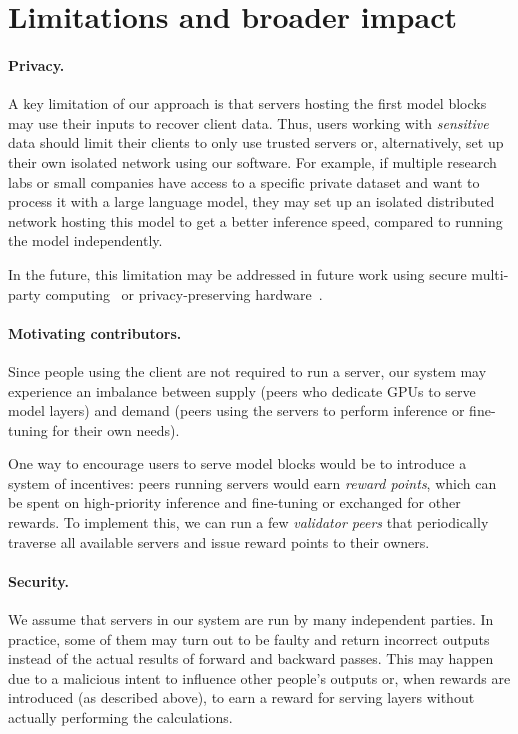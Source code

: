 \section{Limitations and broader impact}\label{sect:discussion}

\paragraph{Privacy.} A key limitation of our approach is that servers hosting the first model blocks may use their inputs to recover client data. Thus, users working with \textit{sensitive} data should limit their clients to only use trusted servers or, alternatively, set up their own isolated network using our software. For example, if multiple research labs or small companies have access to a specific private dataset and want to process it with a large language model, they may set up an isolated distributed network hosting this model to get a better inference speed, compared to running the model independently.

In the future, this limitation may be addressed in future work using secure multi-party computing~\citep{evans2018pragmatic} or privacy-preserving hardware~\citep{nvidia-privacy}.

\paragraph{Motivating contributors.}
Since people using the client are not required to run a server, our system may experience an imbalance between supply (peers who dedicate GPUs to serve model layers) and demand (peers using the servers to perform inference or fine-tuning for their own needs).

One way to encourage users to serve model blocks would be to introduce a system of incentives: peers running servers would earn \textit{reward points}, which can be spent on high-priority inference and fine-tuning or exchanged for other rewards. To implement this, we can run a few \textit{validator peers} that periodically traverse all available servers and issue reward points to their owners.

\paragraph{Security.}
We assume that servers in our system are run by many independent parties. In practice, some of them may turn out to be faulty and return incorrect outputs instead of the actual results of forward and backward passes. This may happen due to a malicious intent to influence other people's outputs or, when rewards are introduced (as described above), to earn a reward for serving layers without actually performing the calculations.

